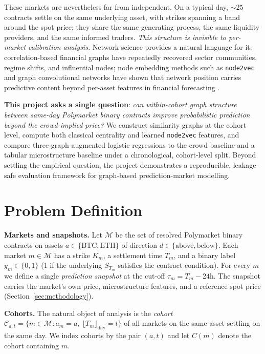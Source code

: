 \documentclass{article} %
\begin{document}
These markets are nevertheless far from independent. On a typical day, ${\sim}25$ contracts settle on the same underlying asset, with strikes spanning a band around the spot price; they share the same generating process, the same liquidity providers, and the same informed traders. \emph{This structure is invisible to per-market calibration analysis.} Network science provides a natural language for it: correlation-based financial graphs \citep{mantegna1999, boginski2005, onnela2003} have repeatedly recovered sector communities, regime shifts, and influential nodes; node embedding methods such as \texttt{node2vec} \citep{grover2016} and graph convolutional networks \citep{kipf2017} have shown that network position carries predictive content beyond per-asset features in financial forecasting \citep{chen2018, zhou2025}.

\textbf{This project asks a single question}: \emph{can within-cohort graph structure between same-day Polymarket binary contracts improve probabilistic prediction beyond the crowd-implied price?} We construct similarity graphs at the cohort level, compute both classical centrality and learned \texttt{node2vec} features, and compare three graph-augmented logistic regressions to the crowd baseline and a tabular microstructure baseline under a chronological, cohort-level split. Beyond settling the empirical question, the project demonstrates a reproducible, leakage-safe evaluation framework for graph-based prediction-market modelling.

\section{Problem Definition}

\textbf{Markets and snapshots.} Let $\mathcal{M}$ be the set of resolved Polymarket binary contracts on assets $a \in \{\text{BTC},\text{ETH}\}$ of direction $d \in \{\text{above},\text{below}\}$. Each market $m \in \mathcal{M}$ has a strike $K_m$, a settlement time $T_m$, and a binary label $y_m \in \{0,1\}$ (1 if the underlying $S_{T_m}$ satisfies the contract condition). For every $m$ we define a single \emph{prediction snapshot} at the cut-off $\tau_m = T_m - 24\text{h}$. The snapshot carries the market's own price, microstructure features, and a reference spot price (Section~\ref{sec:methodology}).

\textbf{Cohorts.} The natural object of analysis is the \emph{cohort} $\mathcal{C}_{a,t} = \{m \in \mathcal{M} : a_m = a,\ \lfloor T_m \rfloor_{\text{day}} = t\}$ of all markets on the same asset settling on the same day. We index cohorts by the pair $(a,t)$ and let $C(m)$ denote the cohort containing $m$.
\end{document}
